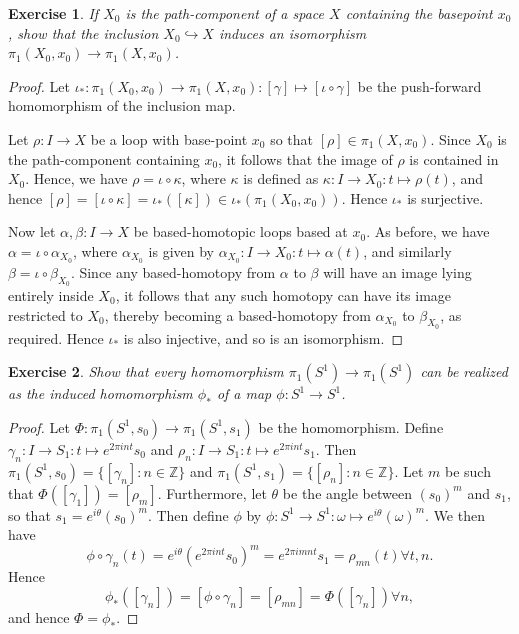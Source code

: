 \documentclass{article}
\newtheorem{exercise}{Exercise}[subsection]
\begin{document}
\begin{exercise}
If $X_0$ is the path-component of a space $X$ containing the basepoint $x_0$, show that the inclusion $X_0\hookrightarrow X$ induces an isomorphism $\pi_1(X_0,x_0)\to\pi_1(X,x_0)$.
\end{exercise}
\begin{proof}
Let $\iota_*:\pi_1(X_0,x_0)\to\pi_1(X,x_0):[\gamma]\mapsto[\iota\circ\gamma]$ be the push-forward homomorphism of the inclusion map.

Let $\rho:I\to X$ be a loop with base-point $x_0$ so that $[\rho]\in\pi_1(X,x_0)$. Since $X_0$ is the path-component containing $x_0$, it follows that the image of $\rho$ is contained in $X_0$. Hence, we have $\rho=\iota\circ\kappa$, where $\kappa$ is defined as $\kappa:I\to X_0:t\mapsto \rho(t)$, and hence $[\rho]=[\iota\circ\kappa]=\iota_*([\kappa])\in\iota_*(\pi_1(X_0,x_0))$. Hence $\iota_*$ is surjective.

Now let $\alpha,\beta:I\to X$ be based-homotopic loops based at $x_0$. As before, we have $\alpha=\iota\circ\alpha_{X_0}$, where $\alpha_{X_0}$ is given by $\alpha_{X_0}:I\to X_0:t\mapsto \alpha(t)$, and similarly $\beta=\iota\circ\beta_{X_0}$. Since any based-homotopy from $\alpha$ to $\beta$ will have an image lying entirely inside $X_0$, it follows that any such homotopy can have its image restricted to $X_0$, thereby becoming a based-homotopy from $\alpha_{X_0}$ to $\beta_{X_0}$, as required. Hence $\iota_*$ is also injective, and so is an isomorphism.
\end{proof}

\begin{exercise}
Show that every homomorphism $\pi_1(S^1)\to\pi_1(S^1)$ can be realized as the induced homomorphism $\phi_*$ of a map $\phi:S^1\to S^1$.
\end{exercise}
\begin{proof}
Let $\Phi:\pi_1(S^1,s_0)\to\pi_1(S^1,s_1)$ be the homomorphism. Define $\gamma_n:I\to S_1:t\mapsto e^{2\pi int}s_0$ and $\rho_n:I\to S_1:t\mapsto e^{2\pi int}s_1$. Then $\pi_1(S^1,s_0)=\{[\gamma_n]:n\in\mathbb{Z}\}$ and $\pi_1(S^1,s_1)=\{[\rho_n]:n\in\mathbb{Z}\}$.  Let $m$ be such that $\Phi([\gamma_1])=[\rho_m]$. Furthermore, let $\theta$ be the angle between $(s_0)^m$ and $s_1$, so that $s_1=e^{i\theta}(s_0)^m$. Then define $\phi$ by $\phi:S^1\to S^1:\omega\mapsto e^{i\theta}(\omega)^m$. We then have \[\phi\circ\gamma_n(t)=e^{i\theta}(e^{2\pi i nt}s_0)^m=e^{2\pi i mnt}s_1=\rho_{mn}(t)\forall t,n.\] Hence \[\phi_*([\gamma_n])=[\phi\circ\gamma_n]=[\rho_{mn}]=\Phi([\gamma_n])\forall n,\] and hence $\Phi=\phi_*$.
\end{proof}
\end{document}
